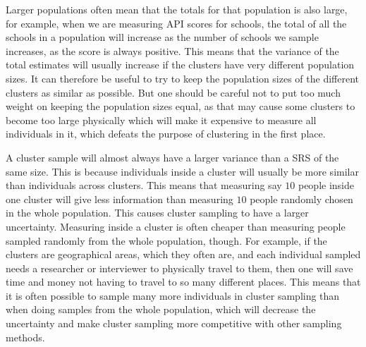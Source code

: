 \documentclass{article}
\begin{document}
Larger populations often mean that the totals for that population is also large,
for example, when we are measuring API scores for schools, the total of all the
schools in a population will increase as the number of schools we sample
increases, as the score is always positive. This means that the variance of the
total estimates will usually increase if the clusters have very different
population sizes. It can therefore be useful to try to keep the population sizes of
the different clusters as similar as possible. But one should be careful not to put
too much weight on keeping the population sizes equal, as that may cause
some clusters to become too large physically which will make it expensive to
measure all individuals in it, which defeats the purpose of clustering
in the first place.

A cluster sample will
almost always have a larger variance than a SRS of the same size. This is
because individuals inside a cluster will usually be more similar than
individuals across clusters. This means that measuring say \(10\) people inside
one cluster will give less information than measuring \(10\) people randomly
chosen in the whole population. This causes cluster sampling to have a larger uncertainty. Measuring
inside a cluster is often cheaper than measuring people sampled randomly from
the whole population, though. For example, if the clusters are geographical areas,
which they often are, and each individual sampled needs a researcher or
interviewer to physically travel to them, then one will save time and money
not having to travel to so many different places. This means that it is often possible to sample
many more individuals in cluster sampling than when doing samples from the whole
population, which will decrease the uncertainty and make cluster sampling more
competitive with other sampling methods.
\end{document}
